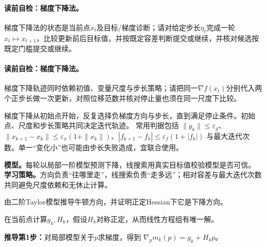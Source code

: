 \paragraph{读前自检：梯度下降法。}梯度下降法的状态是当前点$x_t$及目标/梯度诊断；请对给定步长$\eta_t$完成一轮$x_t\mapsto x_{t+1}$，比较更新前后目标值，并按既定容差判断提交或继续，并核对候选按既定门槛提交或继续。\par

\paragraph{读前自检：梯度下降法。}梯度下降轨迹同时依赖初值、变量尺度与步长策略；请把同一$\nabla f(x_t)$分别代入两个正步长做一次更新，对照位移范数并核对停止量也须在同一尺度下比较。\par

梯度下降从初始点开始，反复选择负梯度方向与步长，直到满足停止条件。初始点、尺度和步长策略共同决定迭代轨迹。
常用判据包括 $\|g_k\|\le\varepsilon_g$、$\|x_{k+1}-x_k\|\le\varepsilon_x(1+\|x_k\|)$、$|f_{k+1}-f_k|\le\varepsilon_f(1+|f_k|)$ 与最大迭代次数。单一“变化小”也可能由步长失败造成，宜联合使用。

\label{struct:V1-C08-CH08}
\textbf{模型。}每轮以局部一阶模型预测下降，线搜索用真实目标值校验模型是否可信。
\label{struct:V1-C08-CH09}
\textbf{学习策略。}方向负责“往哪里走”，线搜索负责“走多远”；相对容差与最大迭代次数共同避免尺度依赖和无休止计算。

\label{struct:V1-C08-CH10}
\label{struct:V1-C08-CH21}
\label{struct:V1-C08-CH22}
\label{struct:V1-C08-CH23}
\label{struct:V1-C08-CH24}
\label{struct:V1-C08-CH25}
\label{struct:V1-C08-CH26}
\label{struct:V1-C08-CH27}

\begin{derivationgoalbox}
由二阶Taylor模型推导牛顿方向，并证明正定Hessian下它是下降方向。
\end{derivationgoalbox}
\begin{derivationprepbox}
在当前点计算$g_k,H_k$，假设$H_k$对称正定，从而线性方程组有唯一解。
\end{derivationprepbox}
\textbf{推导第1步：}对局部模型关于$p$求梯度，得到 $\nabla_pm_k(p)=g_k+H_kp$。

